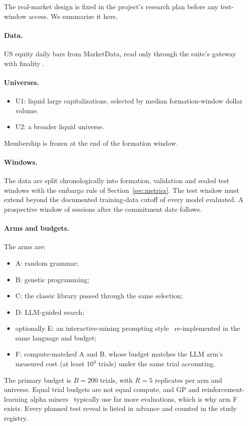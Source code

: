 The real-market design is fixed in the project's research plan before any
test-window access. We summarize it here.

\paragraph{Data.} US equity daily bars from MarketData, read only through the
suite's gateway with finality .

\paragraph{Universes.}
\begin{itemize}
  \item U1: liquid large capitalizations, selected by median formation-window
    dollar volume.
  \item U2: a broader liquid universe.
\end{itemize}
Membership is frozen at the end of the formation window.

\paragraph{Windows.} The data are split chronologically into formation,
validation and sealed test windows with the embargo rule of
Section~\ref{sec:metrics}. The test window must extend beyond the documented
training-data cutoff of every model evaluated. A prospective window of
sessions after the commitment date follows.

\paragraph{Arms and budgets.} The arms are:
\begin{itemize}
  \item A: random grammar;
  \item B: genetic programming;
  \item C: the classic library passed through the same selection;
  \item D: LLM-guided search;
  \item optionally E: an interactive-mining prompting
    style~\citep{wang2023alphagpt} re-implemented in the same language and
    budget;
  \item F: compute-matched A and B, whose budget matches the LLM arm's
    measured cost (at least $10^4$ trials) under the same trial accounting.
\end{itemize}
The primary budget is $B=200$ trials, with $R=5$ replicates per arm and
universe. Equal trial budgets are not equal compute, and GP and
reinforcement-learning alpha miners~\citep{yu2023alphagen} typically use far
more evaluations, which is why arm F exists. Every planned test reveal is
listed in advance and counted in the study registry.

